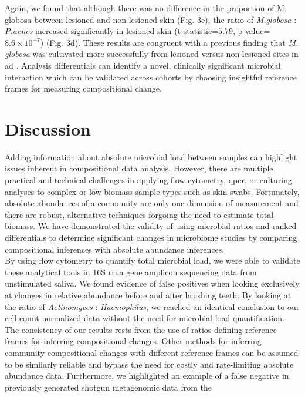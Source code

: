 Again, we found that although there was no difference in the proportion of M. globosa between lesioned and non-lesioned skin
(Fig. 3e), the ratio of \textit{M.globosa} : \textit{P.acnes} increased significantly in lesioned skin (t-statistic=$5.79$,
p-value=$8.6 \times 10^{-7}$) (Fig. 3d). These results are congruent with a previous finding that \textit{M. globosa}
was cultivated more successfully from lesioned versus non-lesioned sites in \gls{ad} \cite{Falk2005-we}. Analysis
differentials can identify a novel, clinically significant microbial interaction which can be validated
across cohorts by choosing insightful reference frames for measuring compositional change.\\[5 mm]
%
\section*{Discussion}
Adding information about absolute microbial load between samples can highlight issues inherent in compositional data
analysis. However, there are multiple practical and technical challenges in applying flow cytometry, \gls{qpcr}, or culturing
analyses to complex or low biomass sample types such as skin swabs. Fortunately, absolute abundances of a community
are only one dimension of measurement and there are robust, alternative techniques forgoing the need to estimate total
biomass. We have demonstrated the validity of using microbial ratios and ranked differentials to determine significant
changes in microbiome studies by comparing compositional inferences with absolute abundance inferences. \\[5 mm]
%
By using flow cytometry to quantify total microbial load, we were able to validate these analytical tools in 16S \gls{rrna} gene
amplicon sequencing data from unstimulated saliva. We found evidence of false positives when looking exclusively at changes
in relative abundance before and after brushing teeth. By looking at the ratio of \textit{Actinomyces} : \textit{Haemophilus}, we reached
an identical conclusion to our cell-count normalized data without the need for microbial load quantification. The
consistency of our results rests from the use of ratios defining reference frames for inferring compositional changes.
Other methods for inferring community compositional changes with different reference frames can be assumed to be
similarly reliable and bypass the need for costly and rate-limiting absolute abundance data.
%
Furthermore, we highlighted an example of a false negative in previously generated shotgun metagenomic data from the

